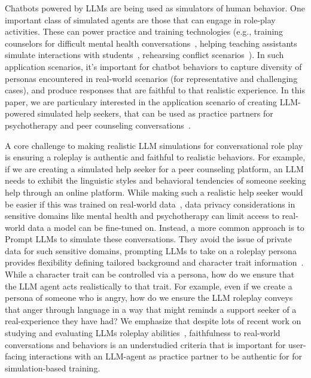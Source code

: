 Chatbots powered by LLMs are being used as simulators of human behavior.  One important class of simulated agents are those that can engage in role-play activities. These can power practice and training technologies (e.g., training counselors for difficult mental health conversations~\cite{demasi-etal-2020-multi}, helping teaching assistants simulate interactions with students~\cite{markel_opferman_landay_piech_2023}, rehearsing conflict scenarios~\cite{shaikh2023rehearsal}).  In such application scenarios, it’s important for chatbot behaviors to capture diversity of personas encountered in real-world scenarios (for representative and challenging cases), and produce responses that are faithful to that realistic experience. In this paper, we are particulary interested in the application scenario of creating LLM-powered simulated help seekers, that can be used as practice partners for psychotherapy and peer counseling conversations~\cite{demszky2023using}. 

A core challenge to making realistic LLM simulations for conversational role play is ensuring a roleplay is authentic and faithful to realistic behaviors.  For example, if we are creating a simulated help seeker for a peer counseling platform, an LLM needs to exhibit the linguistic styles and behavioral tendencies of someone seeking help through an online platform.  While making such a realistic help seeker would be easier if this was trained on real-world data~\cite{demasi-etal-2020-multi}, data privacy considerations in sensitive domains like mental health and psychotherapy can limit access to real-world data a model can be fine-tuned on. Instead, a more common approach is to Prompt LLMs to simulate these conversations.
They avoid the issue of private data for such sensitive domains, prompting LLMs to take on a roleplay persona provides flexibility defining tailored background and character trait information~\cite{park2023generative, zhou2023sotopia}. While a character trait can be controlled via a persona, how do we ensure that the LLM agent acts realistically to that trait. For example, even if we create a persona of someone who is angry, how do we ensure the LLM roleplay conveys that anger through language in a way that might reminds a support seeker of a real-experience they have had?  We emphasize that despite lots of recent work on studying and evaluating LLMs roleplay abilities~\cite{zhou2023sotopia}, faithfulness to real-world conversations and behaviors is an understudied criteria that is important for user-facing interactions with an LLM-agent as practice partner to be authentic for for simulation-based training.

